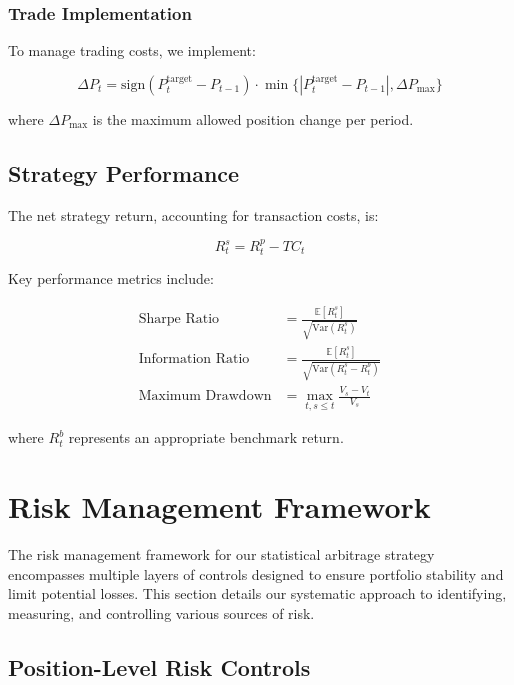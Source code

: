 \subsubsection{Trade Implementation}
To manage trading costs, we implement:

\begin{equation}
    \Delta P_t = \text{sign}(P_t^{\text{target}} - P_{t-1}) \cdot \min\{|P_t^{\text{target}} - P_{t-1}|, \Delta P_{\text{max}}\}
\end{equation}

where $\Delta P_{\text{max}}$ is the maximum allowed position change per period.

\subsection{Strategy Performance}

The net strategy return, accounting for transaction costs, is:

\begin{equation}
    R_t^s = R_t^p - TC_t
\end{equation}

Key performance metrics include:

\begin{equation}
\begin{aligned}
    \text{Sharpe Ratio} &= \frac{\mathbb{E}[R_t^s]}{\sqrt{\text{Var}(R_t^s)}} \\
    \text{Information Ratio} &= \frac{\mathbb{E}[R_t^s]}{\sqrt{\text{Var}(R_t^s - R_t^b)}} \\
    \text{Maximum Drawdown} &= \max_{t,s\leq t}\frac{V_s - V_t}{V_s}
\end{aligned}
\end{equation}

where $R_t^b$ represents an appropriate benchmark return.



\section{Risk Management Framework}

The risk management framework for our statistical arbitrage strategy encompasses multiple layers of controls designed to ensure portfolio stability and limit potential losses. This section details our systematic approach to identifying, measuring, and controlling various sources of risk.

\subsection{Position-Level Risk Controls}

